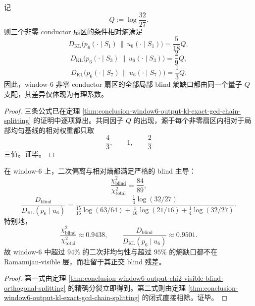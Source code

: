 \begin{corollary}\label{cor:conclusion-window6-output-universal-blind-entropy-quantum}
记
\[
Q:=\log\frac{32}{27}.
\]
则三个非零 conductor 扇区的条件相对熵满足
\[
D_{\mathrm{KL}}\!\bigl(p_6(\cdot\mid S_1)\,\big\|\,u_6(\cdot\mid S_1)\bigr)=\frac{5}{18}Q,
\]
\[
D_{\mathrm{KL}}\!\bigl(p_6(\cdot\mid S_3)\,\big\|\,u_6(\cdot\mid S_3)\bigr)=\frac{2}{9}Q,
\]
\[
D_{\mathrm{KL}}\!\bigl(p_6(\cdot\mid S_7)\,\big\|\,u_6(\cdot\mid S_7)\bigr)=\frac{1}{3}Q.
\]
因此，window-\(6\) 非零 conductor 扇区的全部局部 blind 熵缺口都由同一个量子 \(Q\) 支配，其差异仅体现为有理系数。
\end{corollary}
\begin{proof}
三条公式已在定理 \ref{thm:conclusion-window6-output-kl-exact-gcd-chain-splitting} 的证明中逐项算出。共同因子 \(Q\) 的出现，源于每个非零扇区内相对于局部均匀基线的相对权重都只取
\[
\frac43,\qquad 1,\qquad \frac23
\]
三值。证毕。
\end{proof}

\begin{corollary}\label{cor:conclusion-window6-output-blind-channel-dominates}
在 window-\(6\) 上，二次偏离与相对熵都满足严格的 blind 主导：
\[
\frac{\chi^2_{\mathrm{blind}}}{\chi^2_{\mathrm{total}}}
=
\frac{84}{89},
\]
\[
\frac{D_{\mathrm{blind}}}{D_{\mathrm{KL}}(p_6\mid u_6)}
=
\frac{\frac14\log(32/27)}
{\frac{15}{16}\log(63/64)+\frac{1}{16}\log(21/16)+\frac14\log(32/27)}.
\]
特别地，
\[
\frac{\chi^2_{\mathrm{blind}}}{\chi^2_{\mathrm{total}}}\approx 0.9438,
\qquad
\frac{D_{\mathrm{blind}}}{D_{\mathrm{KL}}(p_6\mid u_6)}\approx 0.9501.
\]
故 window-\(6\) 中超过 \(94\%\) 的二次非均匀性与超过 \(95\%\) 的熵缺口都不在 Ramanujan-visible 层，而驻留于其正交 blind 残差。
\end{corollary}
\begin{proof}
第一式由定理 \ref{thm:conclusion-window6-output-chi2-visible-blind-orthogonal-splitting} 的精确分裂立即得到。第二式则由定理 \ref{thm:conclusion-window6-output-kl-exact-gcd-chain-splitting} 的闭式直接相除。证毕。
\end{proof}

